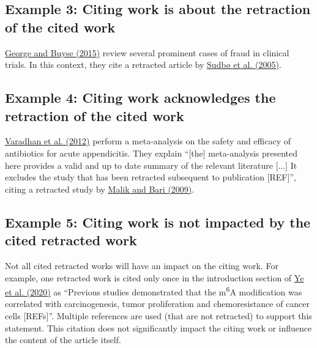 \documentclass[letterpaper, 12pt]{article}
\begin{document}
\subsection*{Example 3: Citing work is about the retraction of the cited work}
\href{https://doi.org/10.4155/cli.14.116}{George and Buyse (2015)} review several prominent cases of fraud in clinical trials. In this context, they cite a retracted article by \href{https://doi.org/10.1016/S0140-6736(05)67488-0}{Sudb\o{} et al. (2005)}.

\subsection*{Example 4: Citing work acknowledges the retraction of the cited work}
\href{https://pmc.ncbi.nlm.nih.gov/articles/PMC3320713/}{Varadhan et al. (2012)} perform a meta-analysis on the safety and efficacy of antibiotics for acute appendicitis. They explain ``[the] meta-analysis presented here provides a valid and up to date summary of the relevant literature [...] It excludes the study that has been retracted subsequent to publication [REF]'', citing a retracted study by \href{https://doi.org/10.1007/s11605-009-0835-5}{Malik and Bari (2009)}. 

\subsection*{Example 5: Citing work is not impacted by the cited retracted work}

Not all cited retracted works will have an impact on the citing work. For example, one retracted work is cited only once in the introduction section of \href{https://doi.org/10.7150/thno.51231}{Ye et al. (2020)} as ``Previous studies demonstrated that the m\textsuperscript{6}A modification was correlated with carcinogenesis, tumor proliferation and chemoresistance of cancer cells [REFs]''. Multiple references are used (that are not retracted) to support this statement. This citation does not significantly impact the citing work or influence the content of the article itself.
\end{document}
